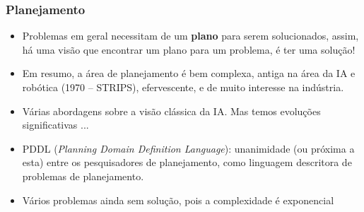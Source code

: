 \begin{frame}[fragile]

    \frametitle{Planejamento}

   \begin{block}{}
     \begin{itemize}
 

      
      

 
       
      \item Problemas em geral necessitam de um \textbf{plano} para serem solucionados, assim,
      há uma visão que encontrar um plano para um problema, é ter uma solução!

      \pause
      
      \item Em resumo, a área de planejamento é bem complexa, 
       antiga na área da IA e robótica (1970 -- STRIPS), 
       efervescente, e de muito interesse na indústria.
           
      \pause
      \item Várias abordagens sobre a visão clássica da IA. Mas temos evoluções
      significativas ...
      
      \pause
      \item PDDL (\textit{Planning Domain Definition Language}): unanimidade (ou próxima a esta)
      entre os pesquisadores de planejamento, como linguagem descritora
      de problemas de planejamento.

      \pause
      \item Vários problemas ainda sem solução, pois a complexidade é exponencial 
      
      
      

    \end{itemize}
    
    \end{block}
    
\end{frame}



